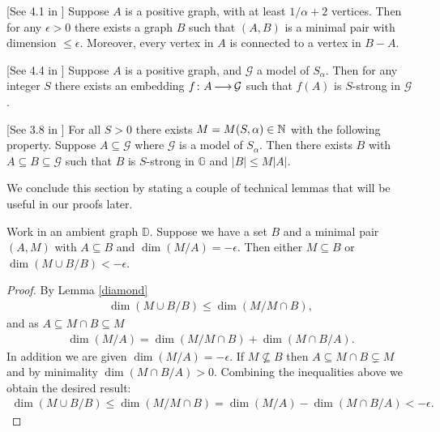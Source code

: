 \documentclass{amsart}
\newcommand{\GG}{\mathbb G}
\newcommand{\DB}{\mathbb D}
\newcommand{\G}{\mathcal G}
\begin{document}
\begin{Lemma} \label{las_min} [See 4.1 in \cite{laskowski}]
  Suppose $A$ is a positive graph, with at least $1/\alpha + 2$ vertices.
  Then for any $\epsilon > 0$ there exists a graph $B$ such that $(A, B)$ is a minimal pair with dimension $\leq \epsilon$.
  Moreover, every vertex in $A$ is connected to a vertex in $B - A$.
\end{Lemma}

\begin{Lemma} \label{las_str} [See 4.4 in \cite{laskowski}]
  Suppose $A$ is a positive graph, and $\G$ a model of $S_\alpha$.
  Then for any integer $S$ there exists an embedding $f \colon A \arr \G$ such that $f(A)$ is $S$-strong in $\G$.
\end{Lemma}
    
\begin{Lemma} \label{las_closure} [See 3.8 in \cite{laskowski}]
  For all $S > 0$ there exists $M = M(S, \alpha) \in \mathbb{N}$ with the following property.
  Suppose $A \subseteq \G$ where $\G$ is a model of $S_\alpha$.
  Then there exists $B$ with $A \subseteq B \subseteq \G$ such that $B$ is $S$-strong in $\GG$ and $|B| \leq M|A|$.
\end{Lemma}

We conclude this section by stating a couple of technical lemmas that will be useful in our proofs later.

\begin{Lemma} \label{minimal_over_set}
  Work in an ambient graph $\DB$.
  Suppose we have a set $B$ and a minimal pair $(A, M)$ with $A \subseteq B$ and $\dim(M/A) = -\epsilon$.
  Then either $M \subseteq B$ or $\dim(M \cup B/B) < -\epsilon$.
\end{Lemma}

\begin{proof}
  By Lemma \ref{diamond}
  \begin{align*}
    \dim(M \cup B/B) \leq \dim(M / M \cap B),
  \end{align*}
  and as $A \subseteq M \cap B \subseteq M$
  \begin{align*}
    \dim (M/A) = \dim(M / M \cap B) + \dim(M \cap B / A).
  \end{align*}
  In addition we are given $\dim (M/A) = -\epsilon$.
  If $M \not\subseteq B$ then $A \subseteq M \cap B \subsetneq M$ and by minimality $\dim(M \cap B / A) > 0$.
  Combining the inequalities above we obtain the desired result:
  \begin{align*}
    \dim(M \cup B/B) \leq \dim(M / M \cap B) = \dim (M/A) - \dim(M \cap B / A) < -\epsilon.
  \end{align*}
\end{proof}
\end{document}
